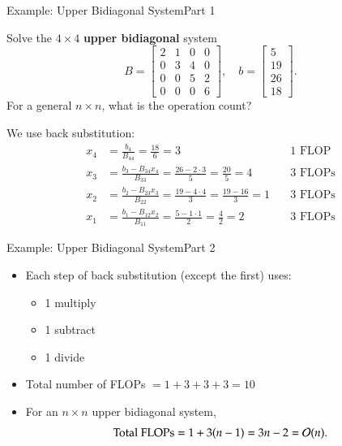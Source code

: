 \documentclass[10pt]{beamer}
\begin{document}
\begin{frame}[shrink]{Example: Upper Bidiagonal System}{Part 1}
\begin{example}
Solve the $4 \times 4$ \textbf{upper bidiagonal} system
\[
B =
\begin{bmatrix}
2 & 1 & 0 & 0 \\
0 & 3 & 4 & 0 \\
0 & 0 & 5 & 2 \\
0 & 0 & 0 & 6
\end{bmatrix}, \quad
b =
\begin{bmatrix}
5 \\ 19 \\ 26 \\ 18
\end{bmatrix}.
\]
For a general $n\times n$, what is the operation count?
\end{example}

We use back substitution:
\begin{align*}
x_4 &= \frac{b_4}{B_{44}} = \frac{18}{6} = 3\quad &\text{1 FLOP} \\
x_3 &= \frac{b_3 - B_{34} x_4}{B_{33}} = \frac{26 - 2\cdot 3}{5} = \frac{20}{5} =4\quad &\text{3 FLOPs} \\
x_2 &= \frac{b_2 - B_{23} x_3}{B_{22}} = \frac{19 - 4 \cdot 4}{3} = \frac{19 -16}{3}  = 1\quad &\text{3 FLOPs} \\
x_1
&= \frac{b_1-B_{12}x_2}{B_{11}}
 = \frac{5-1\cdot1}{2}
 = \frac{4}{2}
 = 2
\quad &\text{3 FLOPs}
\end{align*}
\end{frame}

\begin{frame}[shrink]{Example: Upper Bidiagonal System}{Part 2}
\begin{itemize}
    \item Each step of back substitution (except the first) uses:
    \begin{itemize}
        \item 1 multiply
        \item 1 subtract
        \item 1 divide\\[3mm]
    \end{itemize}
    
    \item Total number of FLOPs $= 1 + 3 + 3 + 3 = 10 $\\[3mm]

\item For an $n\times n$ upper bidiagonal system,
\[
    \text{Total FLOPs}=1+3(n-1)=3n-2={\mathcal{O}}(n).
\]
\end{itemize}
\medskip


\end{frame}
\end{document}
